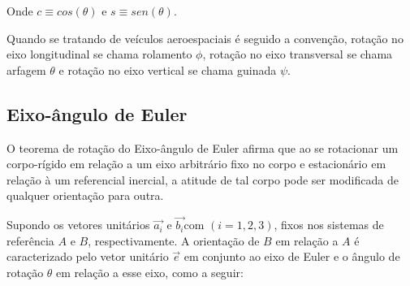 Onde \begin{math}c\equiv cos(\theta)\end{math} e \begin{math}s\equiv sen(\theta)\end{math}.

Quando se tratando de veículos aeroespaciais é seguido a convenção, rotação no eixo longitudinal se chama rolamento \begin{math}\phi\end{math}, rotação no eixo transversal se chama arfagem \begin{math} \theta \end{math} e rotação no eixo vertical se chama guinada \begin{math}\psi\end{math}.

\subsection{Eixo-ângulo de Euler}\label{sec:3.1.2.3}

O teorema de rotação do Eixo-ângulo de Euler afirma que ao se rotacionar um corpo-rígido em relação a um eixo arbitrário fixo no corpo e estacionário em relação à um referencial inercial, a atitude de tal corpo pode ser modificada de qualquer orientação para outra. \cite[p.~329]{wie2008space}

Supondo os vetores unitários \begin{math} \vec{a_i} \end{math} e \begin{math} \vec{b_i} \end{math}com \begin{math} (i=1,2,3) \end{math}, fixos nos sistemas de referência \begin{math} A \end{math} e \begin{math} B \end{math}, respectivamente. A orientação de \begin{math} B \end{math} em relação a \begin{math} A \end{math} é caracterizado pelo vetor unitário \begin{math} \vec{e} \end{math} em conjunto ao eixo de Euler e o ângulo de rotação \begin{math} \theta \end{math} em relação a esse eixo, como a seguir:

